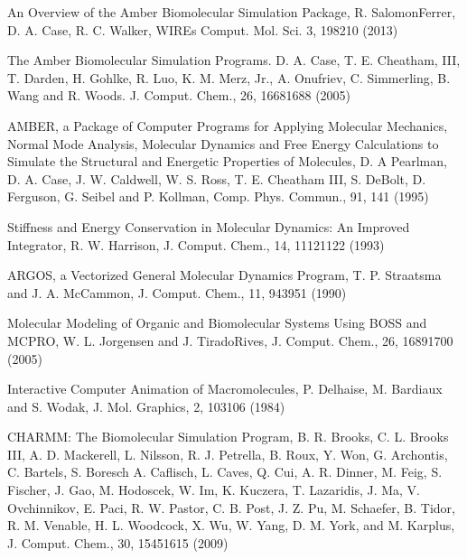 \documentclass[letterpaper,11pt,english]{sphinxmanual}
\begin{document}

An Overview of the Amber Biomolecular Simulation Package, R. Salomon\sphinxhyphen{}Ferrer, D. A. Case, R. C. Walker, WIREs Comput. Mol. Sci. 3, 198\sphinxhyphen{}210 (2013)

The Amber Biomolecular Simulation Programs. D. A. Case, T. E. Cheatham, III, T. Darden, H. Gohlke, R. Luo, K. M. Merz, Jr., A. Onufriev, C. Simmerling, B. Wang and R. Woods. J. Comput. Chem., 26, 1668\sphinxhyphen{}1688 (2005)

AMBER, a Package of Computer Programs for Applying Molecular Mechanics, Normal Mode Analysis, Molecular Dynamics and Free Energy Calculations to Simulate the Structural and Energetic Properties of Molecules, D. A Pearlman, D. A. Case, J. W. Caldwell, W. S. Ross, T. E. Cheatham III, S. DeBolt, D. Ferguson, G. Seibel and P. Kollman, Comp. Phys. Commun., 91, 1\sphinxhyphen{}41 (1995)


Stiffness and Energy Conservation in Molecular Dynamics: An Improved Integrator, R. W. Harrison, J. Comput. Chem., 14, 1112\sphinxhyphen{}1122 (1993)


ARGOS, a Vectorized General Molecular Dynamics Program, T. P. Straatsma and J. A. McCammon, J. Comput. Chem., 11, 943\sphinxhyphen{}951 (1990)


Molecular Modeling of Organic and Biomolecular Systems Using BOSS and MCPRO, W. L. Jorgensen and J. Tirado\sphinxhyphen{}Rives, J. Comput. Chem., 26, 1689\sphinxhyphen{}1700 (2005)


Interactive Computer Animation of Macromolecules, P. Delhaise, M. Bardiaux and S. Wodak, J. Mol. Graphics, 2, 103\sphinxhyphen{}106 (1984)


CHARMM: The Biomolecular Simulation Program, B. R. Brooks, C. L. Brooks III, A. D. Mackerell, L. Nilsson, R. J. Petrella, B. Roux, Y. Won, G. Archontis, C. Bartels, S. Boresch A. Caflisch, L. Caves, Q. Cui, A. R. Dinner, M. Feig, S. Fischer, J. Gao, M. Hodoscek, W. Im, K. Kuczera, T. Lazaridis, J. Ma, V. Ovchinnikov, E. Paci, R. W. Pastor, C. B. Post, J. Z. Pu, M. Schaefer, B. Tidor, R. M. Venable, H. L. Woodcock, X. Wu, W. Yang, D. M. York, and M. Karplus, J. Comput. Chem., 30, 1545\sphinxhyphen{}1615 (2009)
\end{document}
